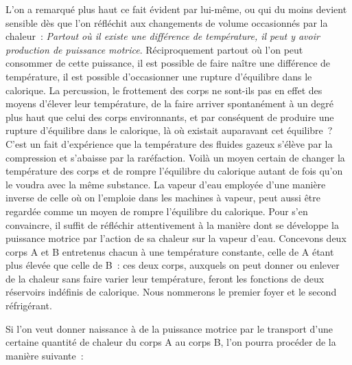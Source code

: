 \documentclass[french,twoside]{book} %
\begin{document}
L’on a remarqué plus haut ce fait évident par lui-même, ou qui du moins devient sensible dès que l’on réfléchit aux changements de volume occasionnés par la chaleur : \emph{Partout où il existe une différence de température, il peut y avoir production de puissance motrice}. Réciproquement partout où l’on peut consommer de cette puissance, il est possible de faire naître une différence de température, il est possible d’occasionner une rupture d’équilibre dans le calorique. La percussion, le frottement des corps ne sont-ils pas en effet des moyens d’élever leur température, de la faire arriver spontanément à un degré plus haut que celui des corps environnants, et par conséquent de produire une rupture d’équilibre dans le calorique, là où existait auparavant cet équilibre ? C’est un fait d’expérience que la température des fluides gazeux s’élève par la compression et s’abaisse par la raréfaction. Voilà un moyen certain de changer la température des corps et de rompre l’équilibre du calorique autant de fois qu’on le voudra avec la même substance. La vapeur d’eau employée d’une manière inverse de celle où on l’emploie dans les machines à vapeur, peut aussi être regardée comme un moyen de rompre l’équilibre du calorique. Pour s’en convaincre, il suffit de réfléchir attentivement à la manière dont se développe la puissance motrice par l’action de sa chaleur sur la vapeur d’eau. Concevons deux corps A et B entretenus chacun à une température constante, celle de A étant plus élevée que celle de B : ces deux corps, auxquels on peut donner ou enlever de la chaleur sans faire varier leur température, feront les fonctions de deux réservoirs indéfinis de calorique. Nous nommerons le premier foyer et le second réfrigérant.\par
Si l’on veut donner naissance à de la puissance motrice par le transport d’une certaine quantité de chaleur du corps A au corps B, l’on pourra procéder de la manière suivante :\par
\end{document}
